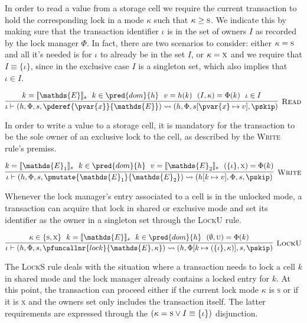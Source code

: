 In order to read a value from a storage cell we require the current transaction to hold the corresponding lock in a mode $\kappa$ such that $\kappa \geq \textsc{s}$. We indicate this by making sure that the transaction identifier $\iota$ is in the set of owners $I$ as recorded by the lock manager $\Phi$. In fact, there are two scenarios to consider: either $\kappa = \textsc{s}$ and all it's needed is for $\iota$ to already be in the set $I$, or $\kappa = \textsc{x}$ and we require that $I \equiv \{ \iota \}$, since in the exclusive case $I$ is a singleton set, which also implies that $\iota \in I$.

\[
\infer[\textsc{Read}]
{
	\iota \vdash (h, \Phi, s, \pderef{\pvar{x}}{\mathds{E}})
	\rightsquigarrow
	(h, \Phi, s[\pvar{x} \mapsto v], \pskip)
}
{
	k = \llbracket \mathds{E} \rrbracket_s\ \
	k \in \pred{dom}{h}\ \
	v = h(k)\ \
	(I, \kappa) = \Phi(k)\ \
	\iota \in I
}
\]

In order to write a value to a storage cell, it is mandatory for the transaction to be the sole owner of an exclusive lock to the cell, as described by the \textsc{Write} rule's premiss.

\[
\infer[\textsc{Write}]
{
	\iota \vdash (h, \Phi, s, \pmutate{\mathds{E}_1}{\mathds{E}_2})
	\rightsquigarrow
	(h[k \mapsto v], \Phi, s, \pskip)
}
{
	k = \llbracket \mathds{E}_1 \rrbracket_s\ \
	k \in \pred{dom}{h}\ \
	v = \llbracket \mathds{E}_2 \rrbracket_s\ \
	(\{ \iota \}, \textsc{x}) = \Phi(k)
}
\]

Whenever the lock manager's entry associated to a cell is in the unlocked mode, a transaction can acquire that lock in shared or exclusive mode and set its identifier as the owner in a singleton set through the \textsc{LockU} rule.

\[
\infer[\textsc{LockU}]
{
	\iota \vdash (h, \Phi, s, \pfuncallnr{lock}{\mathds{E}, \kappa})
	\rightsquigarrow
	(h, \Phi[k \mapsto (\{\iota\}, \kappa)], s, \pskip)
}
{
	\kappa \in \{ \textsc{s}, \textsc{x} \}\ \	
	k = \llbracket \mathds{E} \rrbracket_s\ \
	k \in \pred{dom}{h}\ \
	(\emptyset, \textsc{u}) = \Phi(k)
}
\]

The \textsc{LockS} rule deals with the situation where a transaction needs to lock a cell $k$ in shared mode and the lock manager already contains a locked entry for $k$. At this point, the transaction can proceed either if the current lock mode $\kappa$ is \textsc{s} or if it is \textsc{x} and the owners set only includes the transaction itself. The latter requirements are expressed through the $(\kappa = \textsc{s} \lor I \equiv \{\iota\})$ disjunction.

